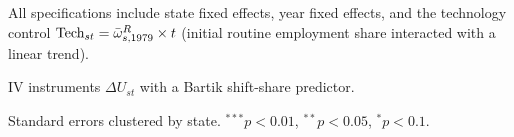 \begin{table}[htbp]
\begin{tablenotes}
\item All specifications include state fixed effects, year fixed effects, and the technology control $\text{Tech}_{st} = \bar{\omega}^{R}_{s,1979} \times t$ (initial routine employment share interacted with a linear trend).
\item IV instruments $\Delta U_{st}$ with a Bartik shift-share predictor.
\item Standard errors clustered by state. $^{***}p<0.01$, $^{**}p<0.05$, $^{*}p<0.1$.
\end{tablenotes}
\end{table}